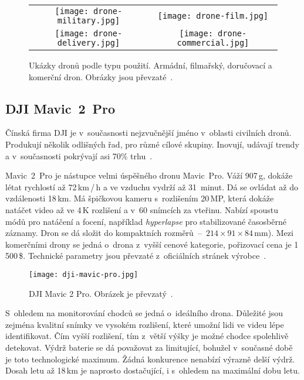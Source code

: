 \begin{figure}[H]
    \centering
    \begin{tabular}{cc}
        \texttt{[image: drone-military.jpg]} &
        \texttt{[image: drone-film.jpg]} \\
        \texttt{[image: drone-delivery.jpg]} &
        \texttt{[image: drone-commercial.jpg]} \\
    \end{tabular}
    \caption[Ukázky dronů podle typu použití]{Ukázky dronů podle typu použití. Armádní, filmařský, doručovací a komerční dron. Obrázky jsou převzaté~\cite{wikiDrone, droneDelivery}.}
    \label{fig_drones}
\end{figure}


\pagebreak

\subsection*{DJI Mavic~2~Pro}

Čínská firma DJI je v~současnosti nejzvučnější jméno v~oblasti civilních dronů. Produkují několik odlišných řad, pro různé cílové skupiny. Inovují, udávají trendy a v~současnosti pokrývají asi 70\% trhu~\cite{articleDji}.

Mavic~2~Pro je nástupce velmi úspěšného dronu Mavic~Pro. Váží 907\,g, dokáže létat rychlostí až 72\,km\,/\,h a ve vzduchu vydrží až 31~minut. Dá se ovládat až do vzdálenosti 18\,km. Má špičkovou kameru s~rozlišením 20\,MP, která dokáže natáčet video až ve 4\,K rozlišení a v~60 snímcích za vteřinu. Nabízí spoustu módů pro natáčení a focení, například \textit{hyperlapse} pro stabilizované časosběrné záznamy. Dron se dá složit do kompaktních rozměrů~--~$214 \times 91 \times 84$\,mm). Mezi komerčními drony se jedná o~drona z~vyšší cenové kategorie, pořizovací cena je 1\,500\,\$. Technické parametry jsou převzaté z~oficiálních stránek výrobce~\cite{specsMavic2}.

\begin{figure}[H]
    \centering
    \texttt{[image: dji-mavic-pro.jpg]}
    \caption[DJI Mavic 2 Pro]{DJI Mavic 2 Pro. Obrázek je převzatý~\cite{specsMavic2}.}
    \label{fig_dji-mavic-pro}
\end{figure}

S~ohledem na monitorování chodců se jedná o~ideálního drona. Důležité jsou zejména kvalitní snímky ve vysokém rozlišení, které umožní lidi ve videu lépe identifikovat. Čím vyšší rozlišení, tím z~větší výšky je možné chodce spolehlivě detekovat. Výdrž baterie se dá považovat za limitující, bohužel v~současné době je toto technologické maximum. Žádná konkurence nenabízí výrazně delší výdrž. Dosah letu až 18\,km je naprosto dostačující, i s~ohledem na maximální dobu letu.

